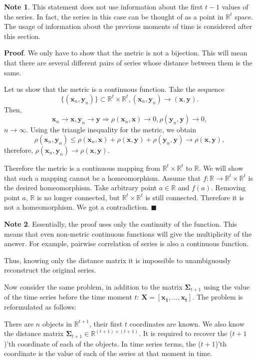 \documentclass{article}
\begin{document}
\textbf{Note 1}. This statement does not use information about the first $t-1$ values of the series. In fact, the series in this case can be thought of as a point in $\mathbb{R}^t$ space. The usage of information about the previous moments of time is considered after this section.

\textbf{Proof}. We only have to show that the metric is not a bijection. This will mean that there are several different pairs of series whose distance between them is the same.

Let us show that the metric is a continuous function. Take the sequence \[\{(\mathbf{x}_n, \mathbf{y}_n)\} \subset \mathbb{R}^t \times \mathbb{R}^t, (\mathbf{x}_n, \mathbf{y}_n) \to (\mathbf{x}, \mathbf{y}).\] Then, \[\mathbf{x}_n\to \mathbf{x}, \mathbf{y}_n\to \mathbf{y} \Rightarrow \rho(\mathbf{x}_n,\mathbf{x})\to 0 ,\rho(\mathbf{y}_n,\mathbf{y})\to 0,\] $n \to \infty.$ Using the triangle inequality for the metric, we obtain \[\rho(\mathbf{x}_n,\mathbf{y}_n)\leqslant \rho(\mathbf{x}_n,\mathbf{x})+\rho(\mathbf{x},\mathbf{y})+\rho(\mathbf{y}_n,\mathbf{y})\to \rho(\mathbf{x},\mathbf{y}),\] therefore, $\rho(\mathbf{x}_n,\mathbf{y}_n)\to \rho(\mathbf{x},\mathbf{y})$.

Therefore the metric is a continuous mapping from $\mathbb{R}^t \times \mathbb{R}^t$ to $\mathbb{R}$. We will show that such a mapping cannot be a homeomorphism. Assume that $f: \mathbb{R} \to \mathbb{R}^t \times \mathbb{R}^t$ is the desired homeomorphism. Take arbitrary point $a \in \mathbb{R}$ and $f(a)$. Removing point $a$, $\mathbb{R}$ is no longer connected, but $\mathbb{R}^t \times \mathbb{R}^t$ is still connected. Therefore it is not a homeomorphism. We got a contradiction.
$\blacksquare$

\textbf{Note 2}. Essentially, the proof uses only the continuity of the function. This means that even non-metric continuous functions will give the multiplicity of the answer. For example, pairwise correlation of series is also a continuous function.

Thus, knowing only the distance matrix it is impossible to unambiguously reconstruct the original series.

Now consider the same problem, in addition to the matrix $\mathbf{\Sigma}_{t+1}$ using the value of the time series before the time moment $t$: $\mathbf{X}=[\mathbf{x_1}, \ldots, \mathbf{x_{t}}]$. The problem is reformulated as follows:

There are $n$ objects in $\mathbb{R}^{t+1}$, their first $t$ coordinates are known. We also know the distance matrix $\mathbf{\Sigma}_{t+1} \in \mathbb{R}^{(t+1) \times (t+1)}$. It is required to recover the ($t+1$)'th coordinate of each of the objects. In time series terms, the ($t+1$)'th coordinate is the value of each of the series at that moment in time.
\end{document}
